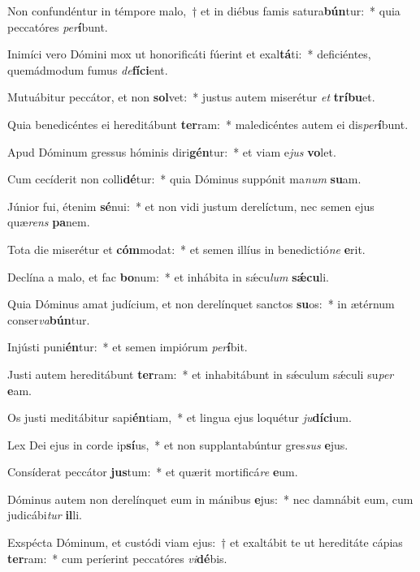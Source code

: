 \item Non confundéntur in témpore malo,~† et in diébus famis satura\textbf{bún}tur:~* quia peccatóres \textit{per}\textbf{í}bunt.
\item Inimíci vero Dómini mox ut honorificáti fúerint et exal\textbf{tá}ti:~* deficiéntes, quemádmodum fumus \textit{de}\textbf{fí}\textbf{ci}ent.
\item Mutuábitur peccátor, et non \textbf{sol}vet:~* justus autem miserétur \textit{et} \textbf{trí}\textbf{bu}et.
\item Quia benedicéntes ei hereditábunt \textbf{ter}ram:~* maledicéntes autem ei dis\textit{per}\textbf{í}bunt.
\item Apud Dóminum gressus hóminis diri\textbf{gén}tur:~* et viam e\textit{jus} \textbf{vo}let.
\item Cum cecíderit non colli\textbf{dé}tur:~* quia Dóminus suppónit ma\textit{num} \textbf{su}am.
\item Júnior fui, étenim \textbf{sé}nui:~* et non vidi justum derelíctum, nec semen ejus quæ\textit{rens} \textbf{pa}nem.
\item Tota die miserétur et \textbf{cóm}modat:~* et semen illíus in benedictió\textit{ne} \textbf{e}rit.
\item Declína a malo, et fac \textbf{bo}num:~* et inhábita in sǽcu\textit{lum} \textbf{sǽ}\textbf{cu}li.
\item Quia Dóminus amat judícium, et non derelínquet sanctos \textbf{su}os:~* in ætérnum conser\textit{va}\textbf{bún}tur.
\item Injústi puni\textbf{én}tur:~* et semen impiórum \textit{per}\textbf{í}bit.
\item Justi autem hereditábunt \textbf{ter}ram:~* et inhabitábunt in sǽculum sǽculi su\textit{per} \textbf{e}am.
\item Os justi meditábitur sapi\textbf{én}tiam,~* et lingua ejus loquétur \textit{ju}\textbf{dí}\textbf{ci}um.
\item Lex Dei ejus in corde ip\textbf{sí}us,~* et non supplantabúntur gres\textit{sus} \textbf{e}jus.
\item Consíderat peccátor \textbf{jus}tum:~* et quærit mortificá\textit{re} \textbf{e}um.
\item Dóminus autem non derelínquet eum in mánibus \textbf{e}jus:~* nec damnábit eum, cum judicábi\textit{tur} \textbf{il}li.
\item Exspécta Dóminum, et custódi viam ejus:~† et exaltábit te ut hereditáte cápias \textbf{ter}ram:~* cum períerint peccatóres \textit{vi}\textbf{dé}bis.
